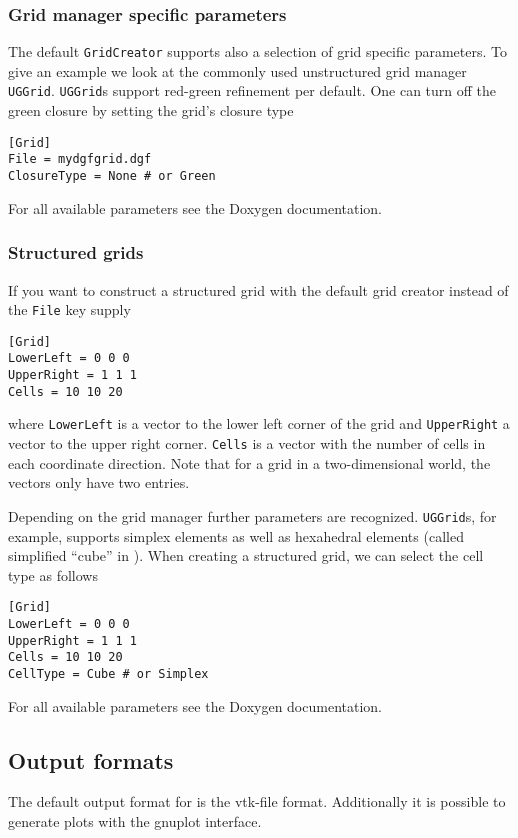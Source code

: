 \subsubsection{Grid manager specific parameters}
The default \texttt{GridCreator} supports also a selection of grid specific parameters.
To give an example we look at the commonly used unstructured grid manager \texttt{UGGrid}.
\texttt{UGGrid}s support red-green refinement per default. One can turn off the green closure by setting the grid's closure type
\begin{lstlisting}[style=DumuxParameterFile]
[Grid]
File = mydgfgrid.dgf
ClosureType = None # or Green
\end{lstlisting}
For all available parameters see the Doxygen documentation.

\subsubsection{Structured grids}
If you want to construct a structured grid with the default grid creator instead of the \texttt{File} key supply
\begin{lstlisting}[style=DumuxParameterFile]
[Grid]
LowerLeft = 0 0 0
UpperRight = 1 1 1
Cells = 10 10 20
\end{lstlisting}
where \texttt{LowerLeft} is a vector to the lower left corner of the grid and \texttt{UpperRight} a vector to the upper right corner.
\texttt{Cells} is a vector with the number of cells in each coordinate direction. Note that for a grid in a two-dimensional world, the
vectors only have two entries.

Depending on the grid manager further parameters are recognized.
\texttt{UGGrid}s, for example, supports simplex elements as well as hexahedral elements
(called simplified ``cube'' in \Dune). When creating a structured grid, we can select the cell type as follows
\begin{lstlisting}[style=DumuxParameterFile]
[Grid]
LowerLeft = 0 0 0
UpperRight = 1 1 1
Cells = 10 10 20
CellType = Cube # or Simplex
\end{lstlisting}
For all available parameters see the Doxygen documentation.


\subsection{Output formats}
The default output format for \Dumux is the vtk-file format. Additionally it is possible 
to generate plots with the gnuplot interface.

